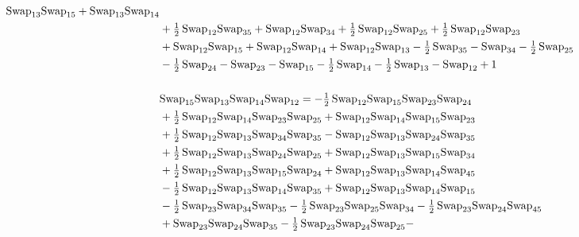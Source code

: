 \documentclass[12pt,dvipsnames,accepted=2016-08-18,a4paper,onecolumn]{quantumarticle}
\numberwithin{equation}{section}
\theoremstyle{definition}
\begin{document}
\begin{align*}
        \textnormal{Swap}_{13} \textnormal{Swap}_{15} + \textnormal{Swap}_{13} \textnormal{Swap}_{14} \\ & + \tfrac12\,\textnormal{Swap}_{12} \textnormal{Swap}_{35} + \textnormal{Swap}_{12} \textnormal{Swap}_{34} + \tfrac12\,\textnormal{Swap}_{12} \textnormal{Swap}_{25} + \tfrac12\,\textnormal{Swap}_{12} \textnormal{Swap}_{23} \\ & +
        \textnormal{Swap}_{12} \textnormal{Swap}_{15} + \textnormal{Swap}_{12} \textnormal{Swap}_{14} + \textnormal{Swap}_{12} \textnormal{Swap}_{13} - \tfrac12\,\textnormal{Swap}_{35}  - \textnormal{Swap}_{34}  - \tfrac12\,\textnormal{Swap}_{25}\\ & - \tfrac12\,\textnormal{Swap}_{24} - \textnormal{Swap}_{23} -
        \textnormal{Swap}_{15} - \tfrac12\,\textnormal{Swap}_{14} - \tfrac12\,\textnormal{Swap}_{13} - \textnormal{Swap}_{12} + 1\\
        \\
        &\textnormal{Swap}_{15}   \textnormal{Swap}_{13}   \textnormal{Swap}_{14}   \textnormal{Swap}_{12} = -\tfrac12\,\textnormal{Swap}_{12} \textnormal{Swap}_{15} \textnormal{Swap}_{23} \textnormal{Swap}_{24} \\ & 
         + \tfrac12\,\textnormal{Swap}_{12} \textnormal{Swap}_{14} \textnormal{Swap}_{23} \textnormal{Swap}_{25} + \textnormal{Swap}_{12} \textnormal{Swap}_{14} \textnormal{Swap}_{15} \textnormal{Swap}_{23} \\ & +
        \tfrac12\,\textnormal{Swap}_{12} \textnormal{Swap}_{13} \textnormal{Swap}_{34} \textnormal{Swap}_{35} - \textnormal{Swap}_{12} \textnormal{Swap}_{13} \textnormal{Swap}_{24} \textnormal{Swap}_{35} \\ & + \tfrac12\,\textnormal{Swap}_{12} \textnormal{Swap}_{13} \textnormal{Swap}_{24} \textnormal{Swap}_{25} +
        \textnormal{Swap}_{12} \textnormal{Swap}_{13} \textnormal{Swap}_{15} \textnormal{Swap}_{34}\\ & 
        + \tfrac12\,\textnormal{Swap}_{12} \textnormal{Swap}_{13} \textnormal{Swap}_{15} \textnormal{Swap}_{24} + \textnormal{Swap}_{12} \textnormal{Swap}_{13} \textnormal{Swap}_{14} \textnormal{Swap}_{45}\\ & -
        \tfrac12\,\textnormal{Swap}_{12} \textnormal{Swap}_{13} \textnormal{Swap}_{14} \textnormal{Swap}_{35} + \textnormal{Swap}_{12} \textnormal{Swap}_{13} \textnormal{Swap}_{14} \textnormal{Swap}_{15} \\ & 
        - \tfrac12\,\textnormal{Swap}_{23} \textnormal{Swap}_{34} \textnormal{Swap}_{35} -
        \tfrac12\,\textnormal{Swap}_{23} \textnormal{Swap}_{25} \textnormal{Swap}_{34} - \tfrac12\,\textnormal{Swap}_{23} \textnormal{Swap}_{24} \textnormal{Swap}_{45}\\ & + \textnormal{Swap}_{23} \textnormal{Swap}_{24} \textnormal{Swap}_{35} - \tfrac12\,\textnormal{Swap}_{23} \textnormal{Swap}_{24} \textnormal{Swap}_{25} -

\end{align*}
\end{document}
